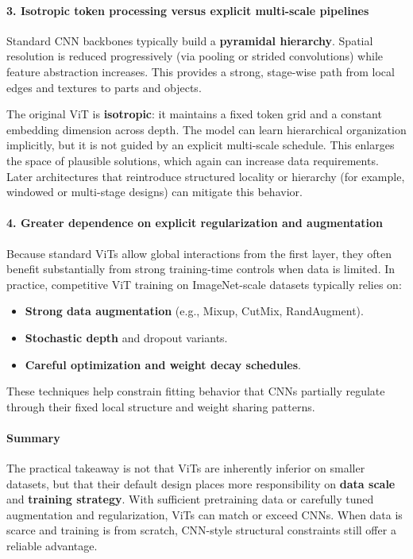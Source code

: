 \paragraph{3. Isotropic token processing versus explicit multi-scale pipelines}
Standard CNN backbones typically build a \textbf{pyramidal hierarchy}. Spatial resolution is reduced progressively (via pooling or strided convolutions) while feature abstraction increases. This provides a strong, stage-wise path from local edges and textures to parts and objects.

\noindent
The original ViT is \textbf{isotropic}: it maintains a fixed token grid and a constant embedding dimension across depth. The model can learn hierarchical organization implicitly, but it is not guided by an explicit multi-scale schedule. This enlarges the space of plausible solutions, which again can increase data requirements. Later architectures that reintroduce structured locality or hierarchy (for example, windowed or multi-stage designs) can mitigate this behavior.

\paragraph{4. Greater dependence on explicit regularization and augmentation}
Because standard ViTs allow global interactions from the first layer, they often benefit substantially from strong training-time controls when data is limited. In practice, competitive ViT training on ImageNet-scale datasets typically relies on:
\begin{itemize}
	\item \textbf{Strong data augmentation} (e.g., Mixup, CutMix, RandAugment).
	\item \textbf{Stochastic depth} and dropout variants.
	\item \textbf{Careful optimization and weight decay schedules}.
\end{itemize}
These techniques help constrain fitting behavior that CNNs partially regulate through their fixed local structure and weight sharing patterns.

\paragraph{Summary}
\noindent
The practical takeaway is not that ViTs are inherently inferior on smaller datasets, but that their default design places more responsibility on \textbf{data scale} and \textbf{training strategy}. With sufficient pretraining data or carefully tuned augmentation and regularization, ViTs can match or exceed CNNs. When data is scarce and training is from scratch, CNN-style structural constraints still offer a reliable advantage.

